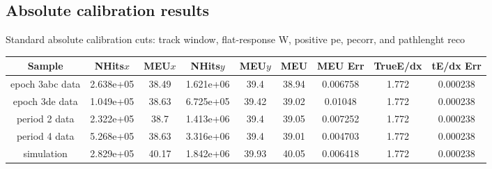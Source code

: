\documentclass[12pt,a4paper]{article}
\begin{document}
\subsection{Absolute calibration results}

Standard absolute calibration cuts: track window, flat-response W, positive pe, pecorr, and pathlenght reco\begin{center}
\begin{table}[h!]
\begin{tabular}{ |c|c|c|c|c|c|c|c|c|}

\hline
Sample & NHits$ x$ & MEU$ x$ & NHits$ y$ & MEU$ y$ & MEU & MEU Err & TrueE/dx & tE/dx Err\\ \hline
epoch 3abc data & 2.638e+05 & 38.49 & 1.621e+06 & 39.4 & 38.94 & 0.006758 & 1.772 & 0.000238\\ \hline
epoch 3de data & 1.049e+05 & 38.63 & 6.725e+05 & 39.42 & 39.02 & 0.01048 & 1.772 & 0.000238\\ \hline
period 2 data & 2.322e+05 & 38.7 & 1.413e+06 & 39.4 & 39.05 & 0.007252 & 1.772 & 0.000238\\ \hline
period 4 data & 5.268e+05 & 38.63 & 3.316e+06 & 39.4 & 39.01 & 0.004703 & 1.772 & 0.000238\\ \hline
simulation & 2.829e+05 & 40.17 & 1.842e+06 & 39.93 & 40.05 & 0.006418 & 1.772 & 0.000238\\ \hline
\end{tabular}
\label{tab:calib_summary_table}
\end{table}
\end{center}
\end{document}
